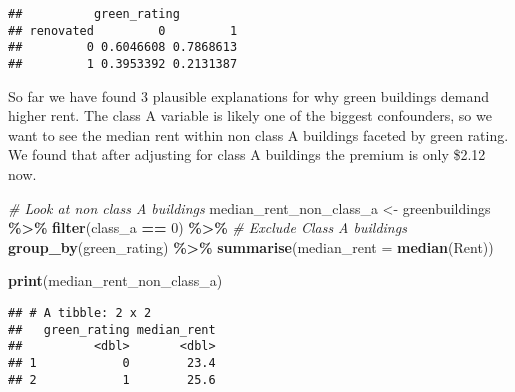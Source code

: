 \documentclass[
]{article}
\newenvironment{Shaded}{\begin{snugshade}}{\end{snugshade}}
\newcommand{\AttributeTok}[1]{\textcolor[rgb]{0.13,0.29,0.53}{#1}}
\newcommand{\CommentTok}[1]{\textcolor[rgb]{0.56,0.35,0.01}{\textit{#1}}}
\newcommand{\DecValTok}[1]{\textcolor[rgb]{0.00,0.00,0.81}{#1}}
\newcommand{\FunctionTok}[1]{\textcolor[rgb]{0.13,0.29,0.53}{\textbf{#1}}}
\newcommand{\NormalTok}[1]{#1}
\newcommand{\OtherTok}[1]{\textcolor[rgb]{0.56,0.35,0.01}{#1}}
\newcommand{\SpecialCharTok}[1]{\textcolor[rgb]{0.81,0.36,0.00}{\textbf{#1}}}
\newcommand{\StringTok}[1]{\textcolor[rgb]{0.31,0.60,0.02}{#1}}
\begin{document}
\begin{verbatim}
##          green_rating
## renovated         0         1
##         0 0.6046608 0.7868613
##         1 0.3953392 0.2131387
\end{verbatim}

So far we have found 3 plausible explanations for why green buildings
demand higher rent. The class A variable is likely one of the biggest
confounders, so we want to see the median rent within non class A
buildings faceted by green rating. We found that after adjusting for
class A buildings the premium is only \$2.12 now.

\begin{Shaded}
\begin{Highlighting}[]
\CommentTok{\# Look at non class A buildings }
\NormalTok{median\_rent\_non\_class\_a }\OtherTok{\textless{}{-}}\NormalTok{ greenbuildings }\SpecialCharTok{\%\textgreater{}\%}
  \FunctionTok{filter}\NormalTok{(class\_a }\SpecialCharTok{==} \DecValTok{0}\NormalTok{) }\SpecialCharTok{\%\textgreater{}\%}  \CommentTok{\# Exclude Class A buildings}
  \FunctionTok{group\_by}\NormalTok{(green\_rating) }\SpecialCharTok{\%\textgreater{}\%}
  \FunctionTok{summarise}\NormalTok{(}\AttributeTok{median\_rent =} \FunctionTok{median}\NormalTok{(Rent))}

\FunctionTok{print}\NormalTok{(median\_rent\_non\_class\_a)}
\end{Highlighting}
\end{Shaded}

\begin{verbatim}
## # A tibble: 2 x 2
##   green_rating median_rent
##          <dbl>       <dbl>
## 1            0        23.4
## 2            1        25.6
\end{verbatim}

\begin{Shaded}
\end{Shaded}
\end{document}
